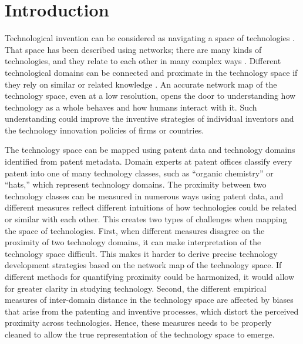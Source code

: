 \documentclass[]{svjour3}
\begin{document}
\maketitle

\section{Introduction}
Technological invention can be considered as navigating a space of technologies \citep{Kauffman2000, Strumsky2002, Fleming2004, Silverberg2005, Frenken2006, Silverberg2007}. That space has been described using networks; there are many kinds of technologies, and they relate to each other in many complex ways \citep{Kay2014, Leydesdorff2014, Breschi2003}. Different technological domains can be connected and proximate in the technology space if they rely on similar or related knowledge \citep{Leydesdorff2014, Arthur2009, Shiffrin2004,Mane2004, Verspagen1997a, Jaffe1986}. An accurate network map of the technology space, even at a low resolution, opens the door to understanding how technology as a whole behaves and how humans interact with it. Such understanding could improve the inventive strategies of individual inventors and the technology innovation policies of firms or countries.

The technology space can be mapped using patent data and technology domains identified from patent metadata. Domain experts at patent offices classify every patent into one of many technology classes, such as ``organic chemistry'' or ``hats,'' which represent technology domains. The proximity between two technology classes can be measured in numerous ways using patent data, and different measures reflect different intuitions of how technologies could be related or similar with each other. This creates two types of challenges when mapping the space of technologies. First, when different measures disagree on the proximity of two technology domains, it can make interpretation of the technology space difficult. This makes it harder to derive precise technology development strategies based on the network map of the technology space. If different methods for quantifying proximity could be harmonized, it would allow for greater clarity in studying technology. Second, the different empirical measures of inter-domain distance in the technology space are affected by biases that arise from the patenting and inventive processes, which distort the perceived proximity across technologies. Hence, these measures needs to be properly cleaned to allow the true representation of the technology space to emerge.
\end{document}
